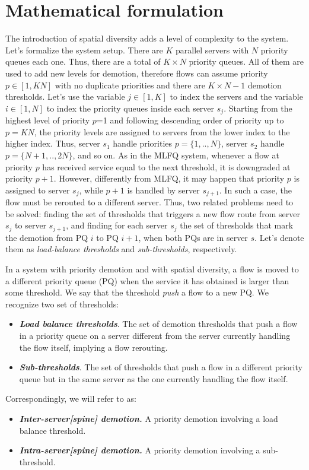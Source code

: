 \section{Mathematical formulation}
\label{sec:complete-model}
The introduction of spatial diversity adds a level of complexity to the system. Let's formalize the system setup. There are $K$ parallel servers with $N$ priority queues each one. Thus, there are a total of $K \times N$ priority queues.  All of them are used to add new levels for demotion, therefore flows can assume priority $p \in [1,KN]$ with no duplicate priorities and there are $K \times N - 1$ demotion thresholds. Let's use the variable $j \in [1,K]$ to index the servers and the variable $i \in [1,N]$ to index the priority queues inside each server $s_j$. Starting from the highest level of priority $p$=1 and following descending order of priority up to $p=KN$, the priority levels are assigned to servers from the lower index to the higher index. Thus, server $s_1$ handle priorities $p=\{1,..,N\}$, server $s_2$ handle $p=\{N+1,..,2N\}$, and so on. As in the MLFQ system, whenever a flow at priority $p$ has received service equal to the next threshold, it is downgraded at priority $p+1$. However, differently from MLFQ, it may happen that priority $p$ is assigned to server $s_j$, while $p+1$ is handled by server $s_{j+1}$. In such a case, the flow must be rerouted to a different server. Thus, two related problems need to be solved: finding the set of thresholds that triggers a new flow route from server $s_j$ to server $s_{j+1}$, and finding for each server $s_j$ the set of thresholds that mark the demotion from PQ $i$ to PQ $i+1$, when both PQs are in server $s$. Let's denote them as \emph{load-balance thresholds} and \emph{sub-thresholds}, respectively. 
\smallskip
\begin{tcolorbox}[title=Terminology]
	In a system with priority demotion and with spatial diversity, a flow is moved to a different priority queue (PQ) when the service it has obtained is larger than some threshold. We say that the threshold \textit{push} a flow to a new PQ. We recognize two set of thresholds:
	\begin{itemize}
		\item \textbf{\emph{Load balance thresholds}}. The set of demotion thresholds that push a flow in a priority queue on a server different from the server currently handling the flow itself, implying a flow rerouting.
		\item \textbf{\emph{Sub-thresholds}}. The set of thresholds that push a flow in a different priority queue but in the same server as the one currently handling the flow itself. 
	\end{itemize}
	Correspondingly, we will refer to as:
	\begin{itemize}
		\item \textbf{\emph{Inter-server[spine] demotion.}} A priority demotion involving a load balance threshold.
		\item \textbf{\emph{Intra-server[spine] demotion.}} A priority demotion involving a sub-threshold.
	\end{itemize}
\end{tcolorbox}
